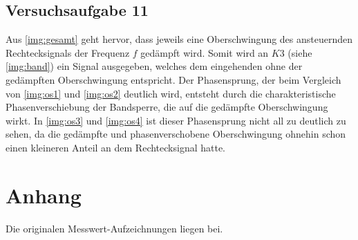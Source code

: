 \documentclass[numbers=noenddot,12pt,a4paper]{scrartcl}
\begin{document}
\subsection{Versuchsaufgabe 11}
Aus \ref{img:gesamt} geht hervor, dass jeweils eine Oberschwingung des ansteuernden Rechtecksignals der Frequenz $f$ gedämpft wird. Somit wird an $K3$ (siehe \ref{img:band}) ein Signal ausgegeben, welches dem eingehenden ohne der gedämpften Oberschwingung entspricht. Der Phasensprung, der beim Vergleich von \ref{img:os1} und \ref{img:os2} deutlich wird, entsteht durch die charakteristische Phasenverschiebung der Bandsperre, die auf die gedämpfte Oberschwingung wirkt. In \ref{img:os3} und \ref{img:os4} ist dieser Phasensprung nicht all zu deutlich zu sehen, da die gedämpfte und phasenverschobene Oberschwingung ohnehin schon einen kleineren Anteil an dem Rechtecksignal hatte. 
\section{Anhang}
Die originalen Messwert-Aufzeichnungen liegen bei.
\end{document}
